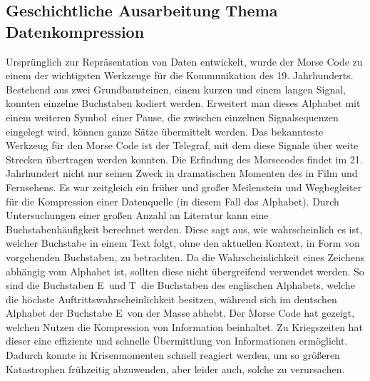 \subsection{Geschichtliche Ausarbeitung Thema Datenkompression}
\label{subsec:main_kompression}
Ursprünglich zur Repräsentation von Daten entwickelt, wurde der Morse Code zu einem der wichtigsten Werkzeuge für die Kommunikation des 19. Jahrhunderts. 
Bestehend aus zwei Grundbausteinen, einem kurzen und einem langen Signal, konnten einzelne Buchstaben kodiert werden. 
Erweitert man dieses Alphabet mit einem weiteren \glqq Symbol\grqq\, einer Pause, die zwischen einzelnen Signalsequenzen eingelegt wird, können ganze Sätze übermittelt werden. 
Das bekannteste Werkzeug für den Morse Code ist der Telegraf, mit dem diese Signale über weite Strecken übertragen werden konnten.
Die Erfindung des Morsecodes findet im 21. Jahrhundert nicht nur seinen Zweck in dramatischen Momenten des in Film und Fernsehens. 
Es war zeitgleich ein früher und großer Meilenstein und Wegbegleiter für die Kompression einer Datenquelle (in diesem Fall das Alphabet). 
Durch Untersuchungen einer großen Anzahl an Literatur kann eine Buchstabenhäufigkeit berechnet werden. 
Diese sagt aus, wie wahrscheinlich es ist, welcher Buchstabe in einem Text folgt, ohne den aktuellen Kontext, in Form von vorgehenden Buchstaben, zu betrachten.
Da die Wahrscheinlichkeit eines Zeichens abhängig vom Alphabet ist, sollten diese nicht übergreifend verwendet werden. 
So sind die Buchstaben \glqq E\grqq\ und \glqq T\grqq\ die Buchstaben des englischen Alphabets, welche die höchste Auftrittswahrscheinlichkeit besitzen, während sich im deutschen Alphabet der Buchstabe \glqq E\grqq\ von der Masse abhebt.
Der Morse Code hat gezeigt, welchen Nutzen die Kompression von Information beinhaltet.
Zu Kriegszeiten hat dieser eine effiziente und schnelle Übermittlung von Informationen ermöglicht.
Dadurch konnte in Krisenmomenten schnell reagiert werden, um so größeren Katastrophen frühzeitig abzuwenden, aber leider auch, solche zu verursachen.

